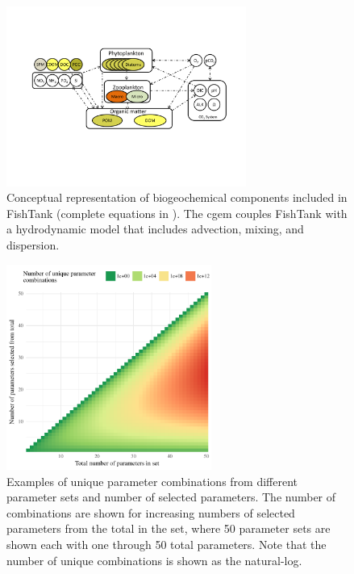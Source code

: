 \documentclass[review]{elsarticle}\usepackage[]{graphicx}\usepackage[]{color}
\begin{document}
\begin{figure}
\centering
\includegraphics[width=0.7\textwidth]{figs/fishmod.pdf}
\caption{Conceptual representation of biogeochemical components included in FishTank (complete equations in \citealt{Eldridge10}). The \acl{cgem} couples FishTank with a hydrodynamic model that includes advection, mixing, and dispersion.}
\label{fig:fishmod}
\end{figure}

\begin{figure}[!ht]

{\centering \includegraphics[width=0.6\textwidth]{figs/combnex-1} 

}

\caption[Examples of unique parameter combinations from different parameter sets and number of selected parameters]{Examples of unique parameter combinations from different parameter sets and number of selected parameters.  The number of combinations are shown for increasing numbers of selected parameters from the total in the set, where 50 parameter sets are shown each with one through 50 total parameters. Note that the number of unique combinations is shown as the natural-log.}\label{fig:combnex}
\end{figure}
\end{document}

